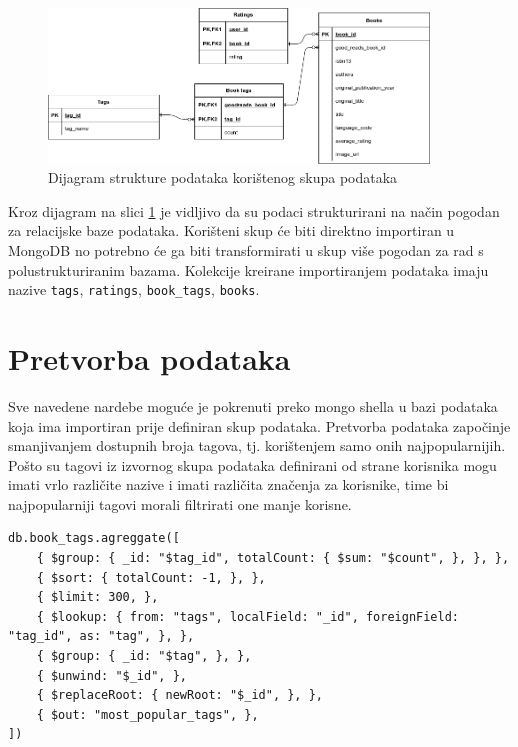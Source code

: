\documentclass[]{foi}
\begin{document}
\begin{figure}[h!]
	\centering
	\includegraphics[width=0.9\textwidth]{slike/goodbooks-10k_dijagram.png}
	\caption{Dijagram strukture podataka korištenog skupa podataka}
	\label{fig:struktura_podataka}
\end{figure}

Kroz dijagram na slici \ref{fig:struktura_podataka} je vidljivo da su podaci strukturirani na način pogodan za relacijske baze podataka.
Korišteni skup će biti direktno importiran u MongoDB no potrebno će ga biti transformirati u skup više pogodan za rad s polustrukturiranim bazama.
Kolekcije kreirane importiranjem podataka imaju nazive \texttt{tags}, \texttt{ratings}, \texttt{book\_tags}, \texttt{books}.

\section{Pretvorba podataka}

Sve navedene nardebe moguće je pokrenuti preko mongo shella u bazi podataka koja ima importiran prije definiran skup podataka.
Pretvorba podataka započinje smanjivanjem dostupnih broja tagova, tj. korištenjem samo onih najpopularnijih. Pošto su tagovi iz izvornog
skupa podataka definirani od strane korisnika mogu imati vrlo različite nazive i imati različita značenja za korisnike, time bi
najpopularniji tagovi morali filtrirati one manje korisne.

\begin{verbatim}
db.book_tags.agreggate([
    { $group: { _id: "$tag_id", totalCount: { $sum: "$count", }, }, },
    { $sort: { totalCount: -1, }, },
    { $limit: 300, },
    { $lookup: { from: "tags", localField: "_id", foreignField: "tag_id", as: "tag", }, },
    { $group: { _id: "$tag", }, },
    { $unwind: "$_id", },
    { $replaceRoot: { newRoot: "$_id", }, },
    { $out: "most_popular_tags", },
])
    \end{verbatim}
\label{lst:tagovi}
\end{document}
